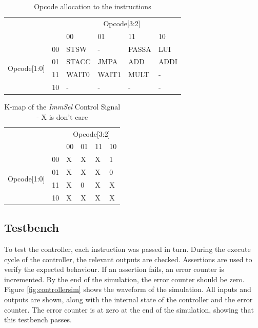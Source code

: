 

\begin{table}
\caption{Opcode allocation to the instructions}
\label{tab:kmap}
\centering
\begin{tabular}{|c|c|p{1.5cm}p{1.5cm}p{1.5cm}p{1.5cm}|}\cline{3-6}
\multicolumn{2}{c|}{} & \multicolumn{4}{|c|}{Opcode[3:2]} \\ \cline{3-6}
\multicolumn{2}{c|}{} 			& 00	& 01	& 11	& 10	\\  \hline
\multirow{4}{*}{Opcode[1:0]} 	& 00 	& STSW	& -	& PASSA	& LUI	\\
				& 01 	& STACC	& JMPA	& ADD	& ADDI	\\
				& 11 	& WAIT0	& WAIT1	& MULT	& -	\\
				& 10 	& -	& -	& -	& -	\\ \hline

\end{tabular}
\end{table}

\begin{table}
\caption{K-map of the \textit{ImmSel} Control Signal - X is don't care}
\label{tab:kmap:immsel}
\centering
\begin{tabular}{|c|c|p{1.5cm}p{1.5cm}p{1.5cm}p{1.5cm}|}\cline{3-6}
\multicolumn{2}{c|}{} & \multicolumn{4}{|c|}{Opcode[3:2]} \\ \cline{3-6}
\multicolumn{2}{c|}{} 			& 00	& 01	& 11	& 10	\\  \hline
\multirow{4}{*}{Opcode[1:0]} 	& 00 	& X	& X	& X	& 1	\\
				& 01 	& X	& X	& X	& 0	\\
				& 11 	& X	& 0 	& X	& X	\\
				& 10 	& X	& X	& X	& X	\\ \hline

\end{tabular}
\end{table}





\subsection{Testbench}

To test the controller, each instruction was passed in turn.
During the execute cycle of the controller, the relevant outputs are checked. 
Assertions are used to verify the expected behaviour. 
If an assertion fails, an error counter is incremented. 
By the end of the simulation, the error counter should be zero.
Figure \ref{fig:controllersim} shows the waveform of the simulation.
All inputs and outputs are shown, along with the internal state of the controller and the error counter.
The error counter is at zero at the end of the simulation, showing that this testbench passes. 


